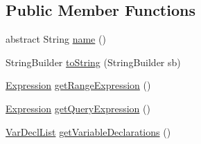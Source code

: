 \subsection*{Public Member Functions}
\begin{DoxyCompactItemize}
\item 
abstract String \hyperlink{classorg_1_1tzi_1_1use_1_1uml_1_1ocl_1_1expr_1_1_exp_query_ab979d349ef0f6a5f4af255007686c395}{name} ()
\item 
String\-Builder \hyperlink{classorg_1_1tzi_1_1use_1_1uml_1_1ocl_1_1expr_1_1_exp_query_a8b54a7233c059b9be36c666de5a2186b}{to\-String} (String\-Builder sb)
\item 
\hyperlink{classorg_1_1tzi_1_1use_1_1uml_1_1ocl_1_1expr_1_1_expression}{Expression} \hyperlink{classorg_1_1tzi_1_1use_1_1uml_1_1ocl_1_1expr_1_1_exp_query_a974ab3755c0073b282a8d0085e038c4e}{get\-Range\-Expression} ()
\item 
\hyperlink{classorg_1_1tzi_1_1use_1_1uml_1_1ocl_1_1expr_1_1_expression}{Expression} \hyperlink{classorg_1_1tzi_1_1use_1_1uml_1_1ocl_1_1expr_1_1_exp_query_a36d640d07146c4a8e0b56b4d0de0a57d}{get\-Query\-Expression} ()
\item 
\hyperlink{classorg_1_1tzi_1_1use_1_1uml_1_1ocl_1_1expr_1_1_var_decl_list}{Var\-Decl\-List} \hyperlink{classorg_1_1tzi_1_1use_1_1uml_1_1ocl_1_1expr_1_1_exp_query_a351b36257afffa1ea67e3213fc3e7ab5}{get\-Variable\-Declarations} ()
\end{DoxyCompactItemize}
